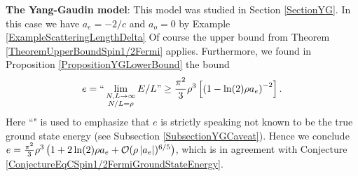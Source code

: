 \textbf{The Yang-Gaudin model}:
This model was studied in Section \ref{SectionYG}. In this case we have $ a_e=-2/c $ and $ a_o=0 $ by Example \ref{ExampleScatteringLengthDelta} Of course the upper bound from Theorem \ref{TheoremUpperBoundSpin1/2Fermi} applies. Furthermore, we found in Proposition \ref{PropositionYGLowerBound} the bound\begin{equation}
e=``\lim\limits_{\substack{N,L\to\infty\\
N/L=\rho}}E/L"\geq \frac{\pi^2}{3}\rho^3\left[\left(1-\ln(2)\rho a_e\right)^{-2}\right].
\end{equation}
Here ``" is used to emphasize that $ e $ is strictly speaking not known to be the true ground state energy (see Subsection \ref{SubsectionYGCaveat}).
Hence we conclude $ e=\frac{\pi^2}{3}\rho^3\left(1+2\ln(2)\rho a_e+\mathcal{O}(\rho \left\lvert a_e \right\rvert)^{6/5}\right) $, which is in agreement with Conjecture \ref{ConjectureEqCSpin1/2FermiGroundStateEnergy}.

